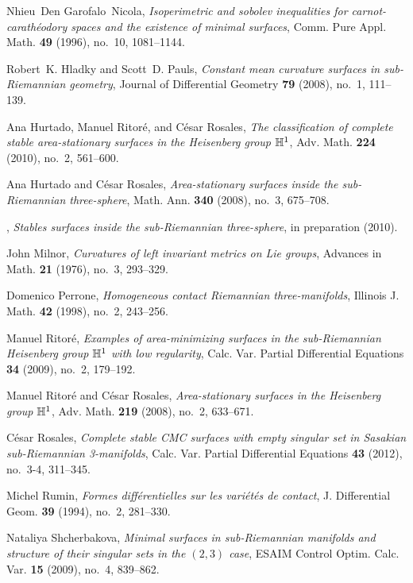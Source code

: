 \documentclass[10pt]{amsart}
\theoremstyle{definition}
\theoremstyle{remark}
\numberwithin{equation}{section}
\begin{document}
\begin{thebibliography}{10}
Nhieu~Den Garofalo~Nicola, \emph{Isoperimetric and sobolev inequalities for
  carnot-carath\'eodory spaces and the existence of minimal surfaces}, Comm.
  Pure Appl. Math. \textbf{49} (1996), no.~10, 1081--1144.

Robert~K. Hladky and Scott~D. Pauls, \emph{Constant mean curvature surfaces in
  sub-{R}iemannian geometry}, Journal of Differential Geometry \textbf{79}
  (2008), no.~1, 111--139.

Ana Hurtado, Manuel Ritor{\'e}, and C{\'e}sar Rosales, \emph{The classification
  of complete stable area-stationary surfaces in the {H}eisenberg group {$\Bbb
  H^1$}}, Adv. Math. \textbf{224} (2010), no.~2, 561--600. 

Ana Hurtado and C{\'e}sar Rosales, \emph{Area-stationary surfaces inside the
  sub-{R}iemannian three-sphere}, Math. Ann. \textbf{340} (2008), no.~3,
  675--708. 

\bysame, \emph{Stables surfaces inside the sub-{R}iemannian three-sphere}, in
  preparation (2010).

John Milnor, \emph{Curvatures of left invariant metrics on {L}ie groups},
  Advances in Math. \textbf{21} (1976), no.~3, 293--329. 

Domenico Perrone, \emph{Homogeneous contact {R}iemannian three-manifolds},
  Illinois J. Math. \textbf{42} (1998), no.~2, 243--256. 

Manuel Ritor{\'e}, \emph{Examples of area-minimizing surfaces in the
  sub-{R}iemannian {H}eisenberg group {$\Bbb H^1$} with low regularity}, Calc.
  Var. Partial Differential Equations \textbf{34} (2009), no.~2, 179--192.

Manuel Ritor{\'e} and C{\'e}sar Rosales, \emph{Area-stationary surfaces in the
  {H}eisenberg group {$\Bbb H^1$}}, Adv. Math. \textbf{219} (2008), no.~2,
  633--671. 

C{\'e}sar Rosales, \emph{Complete stable {CMC} surfaces with empty singular set
  in {S}asakian sub-{R}iemannian 3-manifolds}, Calc. Var. Partial Differential
  Equations \textbf{43} (2012), no.~3-4, 311--345. 

Michel Rumin, \emph{Formes diff\'erentielles sur les vari\'et\'es de contact},
  J. Differential Geom. \textbf{39} (1994), no.~2, 281--330. 

Nataliya Shcherbakova, \emph{Minimal surfaces in sub-{R}iemannian manifolds and
  structure of their singular sets in the {$(2,3)$} case}, ESAIM Control Optim.
  Calc. Var. \textbf{15} (2009), no.~4, 839--862. 

\end{thebibliography}
\end{document}
